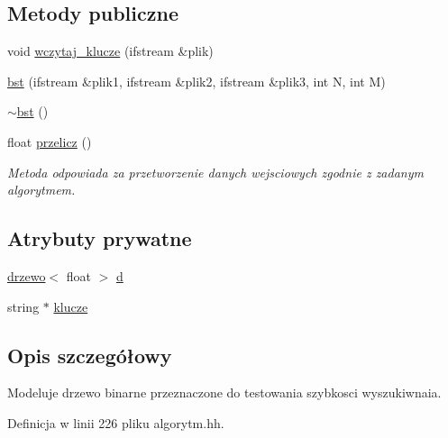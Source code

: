 \subsection*{\-Metody publiczne}
\begin{DoxyCompactItemize}
\item 
void \hyperlink{classbst_ac1ed9851250160995112e06c9af324aa}{wczytaj\-\_\-klucze} (ifstream \&plik)
\item 
\hyperlink{classbst_a3f7f0a490dae2027ad55151d40db770a}{bst} (ifstream \&plik1, ifstream \&plik2, ifstream \&plik3, int \-N, int \-M)
\item 
\hyperlink{classbst_a4755b663e678f2207dc32caccb5bb18d}{$\sim$bst} ()
\item 
float \hyperlink{classbst_a7991c5cd90a0d350a3150b31aab9401c}{przelicz} ()
\begin{DoxyCompactList}\small\item\em \-Metoda odpowiada za przetworzenie danych wejsciowych zgodnie z zadanym algorytmem. \end{DoxyCompactList}\end{DoxyCompactItemize}
\subsection*{\-Atrybuty prywatne}
\begin{DoxyCompactItemize}
\item 
\hyperlink{classdrzewo}{drzewo}$<$ float $>$ \hyperlink{classbst_a50ee6ca023b4ca0484157ccd8716fd37}{d}
\item 
string $\ast$ \hyperlink{classbst_a7e0cb2caf584c2de1d5ba767731c9c3a}{klucze}
\end{DoxyCompactItemize}


\subsection{\-Opis szczegółowy}
\-Modeluje drzewo binarne przeznaczone do testowania szybkosci wyszukiwnaia. 

\-Definicja w linii 226 pliku algorytm.\-hh.



